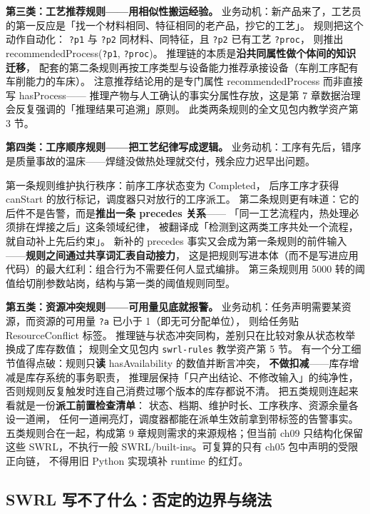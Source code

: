 \textbf{第三类：工艺推荐规则——用相似性搬运经验。}
业务动机：新产品来了，工艺员的第一反应是「找一个材料相同、特征相同的老产品，抄它的工艺」。
规则把这个动作自动化：
\texttt{?p1} 与 \texttt{?p2} 同材料、同特征，且 \texttt{?p2} 已有工艺 \texttt{?proc}，
则推出 recommendedProcess(\texttt{?p1}, \texttt{?proc})。
推理链的本质是\textbf{沿共同属性做个体间的知识迁移}，
配套的第二条规则再按工序类型与设备能力推荐承接设备（车削工序配有车削能力的车床）。
注意推荐结论用的是专门属性 recommendedProcess 而非直接写 hasProcess——
推理产物与人工确认的事实分属性存放，这是第 7 章数据治理会反复强调的「推理结果可追溯」原则。
此类两条规则的全文见包内教学资产第 3 节。

\textbf{第四类：工序顺序规则——把工艺纪律写成逻辑。}
业务动机：工序有先后，错序是质量事故的温床——焊缝没做热处理就交付，残余应力迟早出问题。



第一条规则维护执行秩序：前序工序状态变为 Completed，
后序工序才获得 canStart 的放行标记，调度器只对放行的工序派工。
第二条规则更有味道：它的后件不是告警，而是\textbf{推出一条 precedes 关系}——
「同一工艺流程内，热处理必须排在焊接之后」这条领域纪律，
被翻译成「检测到这两类工序共处一个流程，就自动补上先后约束」。
新补的 precedes 事实又会成为第一条规则的前件输入——\textbf{规则之间通过共享词汇表自动接力}，
这是把规则写进本体（而不是写进应用代码）的最大红利：组合行为不需要任何人显式编排。
第三条规则用 5000 转的阈值给切削参数站岗，结构与第一类的阈值规则同型。

\textbf{第五类：资源冲突规则——可用量见底就报警。}
业务动机：任务声明需要某资源，而资源的可用量 \texttt{?a} 已小于 1（即无可分配单位），
则给任务贴 ResourceConflict 标签。
推理链与状态冲突同构，差别只在比较对象从状态枚举换成了库存数值；
规则全文见包内 \texttt{swrl-rules} 教学资产第 5 节。
有一个分工细节值得点破：规则只\textbf{读} hasAvailability 的数值并断言冲突，
\textbf{不做扣减}——库存增减是库存系统的事务职责，
推理层保持「只产出结论、不修改输入」的纯净性，
否则规则反复触发时连自己消费过哪个版本的库存都说不清。
把五类规则连起来看就是一份\textbf{派工前置检查清单}：
状态、档期、维护时长、工序秩序、资源余量各设一道闸，
任何一道闸亮灯，调度器都能在派单生效前拿到带标签的告警事实。
五类规则合在一起，构成第 9 章规则需求的来源规格；但当前 ch09 只结构化保留
这些 SWRL，不执行一般 SWRL/built-ins。可复算的只有 ch05 包中声明的受限正向链，
不得用旧 Python 实现填补 runtime 的红灯。

\subsection{SWRL 写不了什么：否定的边界与绕法}


